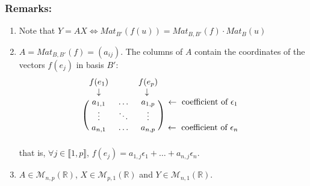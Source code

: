 \documentclass[notitlepage]{math}
\begin{document}
\subsubsection{Remarks:}
\begin{enumerate}
    \item Note that $Y = AX \Longleftrightarrow Mat_{B'}(f(u)) = Mat_{B,B'}(f) \cdot Mat_B(u)$
    \item $A = Mat_{B,B'}(f) = (a_{ij})$. The columns of $A$ contain the coordinates of the vectors $f(e_j)$ in basis $B'$:
    \[
\begin{blockarray}{cccc}
f(e_1) &   & f(e_p)  \\
\begin{block}{cccc}
    \downarrow &   & \downarrow  \\
  \end{block}
\begin{block}{(ccc)c}
  a_{1,1} & \dots & a_{1,p} & \leftarrow  \text{ coefficient of } \epsilon_1 \\
    \vdots & \ddots & \vdots & \\
    a_{n,1} & \dots & a_{n,p} & \leftarrow  \text{ coefficient of } \epsilon_n \\
\end{block}
\end{blockarray}
 \]
 that is, $\forall j \in \llbracket 1,p \rrbracket$, $f(e_j) = a_{1,j} \epsilon_1 + \dots + a_{n,j} \epsilon_n$.
 \item $A \in \mathcal{M}_{n,p}(\mathbb{R})$, $X \in \mathcal{M}_{p,1}(\mathbb{R})$ and $Y \in \mathcal{M}_{n,1}(\mathbb{R})$.
\end{enumerate}
\end{document}

